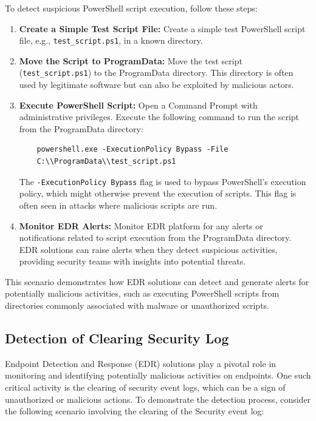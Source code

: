 \documentclass{article}
\begin{document}
To detect suspicious PowerShell script execution, follow these steps:

\begin{enumerate}
    \item \textbf{Create a Simple Test Script File:} Create a simple test PowerShell script file, e.g., \texttt{test\_script.ps1}, in a known directory.
    
    \item \textbf{Move the Script to ProgramData:} Move the test script (\texttt{test\_script.ps1}) to the ProgramData directory. This directory is often used by legitimate software but can also be exploited by malicious actors.
    
    \item \textbf{Execute PowerShell Script:} Open a Command Prompt with administrative privileges. Execute the following command to run the script from the ProgramData directory:
    
    \begin{verbatim}
    powershell.exe -ExecutionPolicy Bypass -File 
    C:\\ProgramData\\test_script.ps1
    \end{verbatim}
    
    The \texttt{-ExecutionPolicy Bypass} flag is used to bypass PowerShell's execution policy, which might otherwise prevent the execution of scripts. This flag is often seen in attacks where malicious scripts are run.
    
    \item \textbf{Monitor EDR Alerts:} Monitor EDR platform for any alerts or notifications related to script execution from the ProgramData directory. EDR solutions can raise alerts when they detect suspicious activities, providing security teams with insights into potential threats.
\end{enumerate}

This scenario demonstrates how EDR solutions can detect and generate alerts for potentially malicious activities, such as executing PowerShell scripts from directories commonly associated with malware or unauthorized scripts.

\subsection{Detection of Clearing Security Log}

Endpoint Detection and Response (EDR) solutions play a pivotal role in monitoring and identifying potentially malicious activities on endpoints. One such critical activity is the clearing of security event logs, which can be a sign of unauthorized or malicious actions. To demonstrate the detection process, consider the following scenario involving the clearing of the Security event log:
\end{document}
